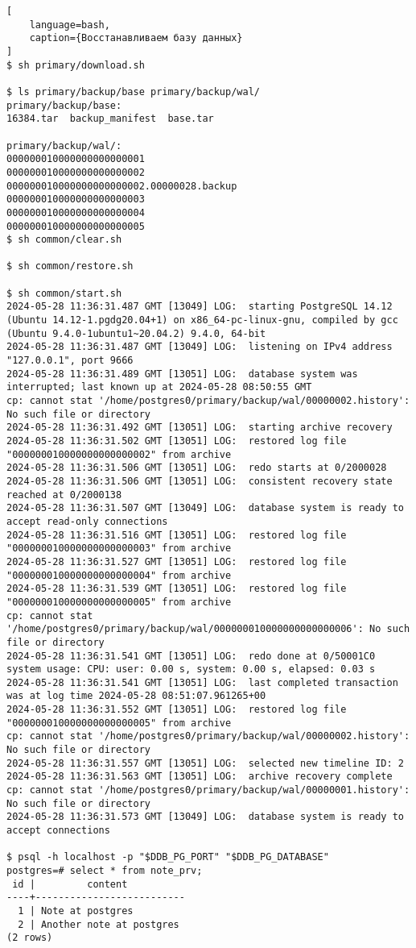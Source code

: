 \documentclass{article}
\begin{document}
\begin{lstlisting}[
    language=bash,
    caption={Восстанавливаем базу данных}
]
$ sh primary/download.sh 

$ ls primary/backup/base primary/backup/wal/
primary/backup/base:
16384.tar  backup_manifest  base.tar

primary/backup/wal/:
000000010000000000000001
000000010000000000000002
000000010000000000000002.00000028.backup
000000010000000000000003
000000010000000000000004
000000010000000000000005
$ sh common/clear.sh 

$ sh common/restore.sh 

$ sh common/start.sh 
2024-05-28 11:36:31.487 GMT [13049] LOG:  starting PostgreSQL 14.12 (Ubuntu 14.12-1.pgdg20.04+1) on x86_64-pc-linux-gnu, compiled by gcc (Ubuntu 9.4.0-1ubuntu1~20.04.2) 9.4.0, 64-bit
2024-05-28 11:36:31.487 GMT [13049] LOG:  listening on IPv4 address "127.0.0.1", port 9666
2024-05-28 11:36:31.489 GMT [13051] LOG:  database system was interrupted; last known up at 2024-05-28 08:50:55 GMT
cp: cannot stat '/home/postgres0/primary/backup/wal/00000002.history': No such file or directory
2024-05-28 11:36:31.492 GMT [13051] LOG:  starting archive recovery
2024-05-28 11:36:31.502 GMT [13051] LOG:  restored log file "000000010000000000000002" from archive
2024-05-28 11:36:31.506 GMT [13051] LOG:  redo starts at 0/2000028
2024-05-28 11:36:31.506 GMT [13051] LOG:  consistent recovery state reached at 0/2000138
2024-05-28 11:36:31.507 GMT [13049] LOG:  database system is ready to accept read-only connections
2024-05-28 11:36:31.516 GMT [13051] LOG:  restored log file "000000010000000000000003" from archive
2024-05-28 11:36:31.527 GMT [13051] LOG:  restored log file "000000010000000000000004" from archive
2024-05-28 11:36:31.539 GMT [13051] LOG:  restored log file "000000010000000000000005" from archive
cp: cannot stat '/home/postgres0/primary/backup/wal/000000010000000000000006': No such file or directory
2024-05-28 11:36:31.541 GMT [13051] LOG:  redo done at 0/50001C0 system usage: CPU: user: 0.00 s, system: 0.00 s, elapsed: 0.03 s
2024-05-28 11:36:31.541 GMT [13051] LOG:  last completed transaction was at log time 2024-05-28 08:51:07.961265+00
2024-05-28 11:36:31.552 GMT [13051] LOG:  restored log file "000000010000000000000005" from archive
cp: cannot stat '/home/postgres0/primary/backup/wal/00000002.history': No such file or directory
2024-05-28 11:36:31.557 GMT [13051] LOG:  selected new timeline ID: 2
2024-05-28 11:36:31.563 GMT [13051] LOG:  archive recovery complete
cp: cannot stat '/home/postgres0/primary/backup/wal/00000001.history': No such file or directory
2024-05-28 11:36:31.573 GMT [13049] LOG:  database system is ready to accept connections

$ psql -h localhost -p "$DDB_PG_PORT" "$DDB_PG_DATABASE"
postgres=# select * from note_prv;
 id |         content          
----+--------------------------
  1 | Note at postgres
  2 | Another note at postgres
(2 rows)
\end{lstlisting}
\end{document}
